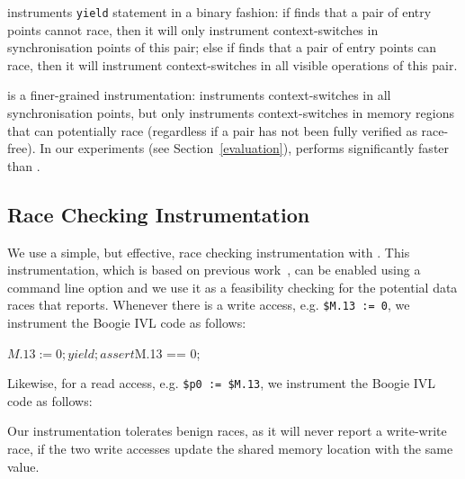 \yieldcoarse instruments \texttt{yield} statement in a binary fashion: if \whoop finds that a pair of entry points cannot race, then it will only instrument context-switches in synchronisation points of this pair; else if \whoop finds that a pair of entry points can race, then it will instrument context-switches in all visible operations of this pair.

\yieldmr is a finer-grained instrumentation: \whoop instruments context-switches in all synchronisation points, but only instruments context-switches in memory regions that can potentially race (regardless if a pair has not been fully verified as race-free). In our experiments (see Section~\ref{evaluation}), \yieldmr performs significantly faster than \yieldcoarse.

\subsection{Race Checking Instrumentation}
\label{bf:racechecking}

We use a simple, but effective, race checking instrumentation with \corral. This instrumentation, which is based on previous work~\cite{}, can be enabled using a command line option and we use it as a feasibility checking for the potential data races that \whoop reports. Whenever there is a write access, e.g. \texttt{\$M.13 := 0}, we instrument the Boogie IVL code as follows:

\begin{boogie}
$M.13 := 0;
yield;
assert $M.13 == 0;
\end{boogie}

Likewise, for a read access, e.g. \texttt{\$p0 := \$M.13}, we instrument the Boogie IVL code as follows:


Our instrumentation tolerates benign races, as it will never report a write-write race, if the two write accesses update the shared memory location with the same value.
